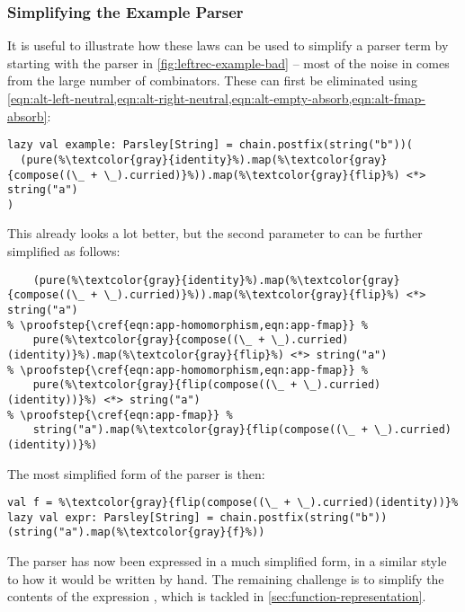 \documentclass[../../../main.tex]{subfiles}
\begin{document}
\subsubsection{Simplifying the Example Parser}\label{sec:simplify-example}
It is useful to illustrate how these laws can be used to simplify a parser term by starting with the parser in \cref{fig:leftrec-example-bad} --
most of the noise in  comes from the large number of  combinators.
These can first be eliminated using \cref{eqn:alt-left-neutral,eqn:alt-right-neutral,eqn:alt-empty-absorb,eqn:alt-fmap-absorb}:
\begin{verbatim}
lazy val example: Parsley[String] = chain.postfix(string("b"))(
  (pure(%\textcolor{gray}{identity}%).map(%\textcolor{gray}{compose((\_ + \_).curried)}%)).map(%\textcolor{gray}{flip}%) <*> string("a")
)
\end{verbatim}
%
This already looks a lot better, but the second parameter to  can be further simplified as follows:
\begin{verbatim}
    (pure(%\textcolor{gray}{identity}%).map(%\textcolor{gray}{compose((\_ + \_).curried)}%)).map(%\textcolor{gray}{flip}%) <*> string("a")
% \proofstep{\cref{eqn:app-homomorphism,eqn:app-fmap}} %
    pure(%\textcolor{gray}{compose((\_ + \_).curried)(identity)}%).map(%\textcolor{gray}{flip}%) <*> string("a")
% \proofstep{\cref{eqn:app-homomorphism,eqn:app-fmap}} %
    pure(%\textcolor{gray}{flip(compose((\_ + \_).curried)(identity))}%) <*> string("a")
% \proofstep{\cref{eqn:app-fmap}} %
    string("a").map(%\textcolor{gray}{flip(compose((\_ + \_).curried)(identity))}%)
\end{verbatim}
%
The most simplified form of the parser is then:
\begin{verbatim}
val f = %\textcolor{gray}{flip(compose((\_ + \_).curried)(identity))}%
lazy val expr: Parsley[String] = chain.postfix(string("b"))(string("a").map(%\textcolor{gray}{f}%))
\end{verbatim}
%
The parser has now been expressed in a much simplified form, in a similar style to how it would be written by hand.
The remaining challenge is to simplify the contents of the expression , which is tackled in \cref{sec:function-representation}.
\end{document}

